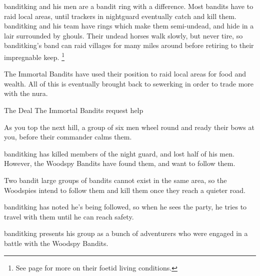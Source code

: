\begin{multicols}{2}
\resumecontents[Town]

\stopcontents[sq]

\label{immortalbandits}

\stopcontents[Town]

\startcontents[sq]

\sqminitoc

\noindent
\Gls{banditking} and his men are a bandit ring with a difference.
Most bandits have to raid local areas, until trackers in \gls{nightguard} eventually catch and kill them.
\Gls{banditking} and his team have rings which make them semi-undead, and hide in a lair surrounded by ghouls.
Their undead horses walk slowly, but never tire, so \gls{banditking}'s band can raid villages for many miles around before retiring to their impregnable keep.%
\footnote{See page \pageref{necromancers_lair} for more on their foetid living conditions.}

The Immortal Bandits have used their position to raid local areas for food and wealth.
All of this is eventually brought back to \gls{sewerking} in order to trade more with the nura.

{The Deal}%
{The Immortal Bandits request help}%

\begin{boxtext}

  As you top the next hill, a group of six men wheel round and ready their bows at you, before their commander calms them.

\end{boxtext}

\begin{exampletext}

  \Gls{banditking} has killed members of the night guard, and lost half of his men.
  However, the Woodspy Bandits have found them, and want to follow them.

  Two bandit large groups of bandits cannot exist in the same area, so the Woodspies intend to follow them and kill them once they reach a quieter road.

  \Gls{banditking} has noted he's being followed, so when he sees the party, he tries to travel with them until he can reach safety.

\end{exampletext}

\noindent
\Gls{banditking} presents his group as a bunch of adventurers who were engaged in a battle with the Woodspy Bandits.


\end{multicols}
